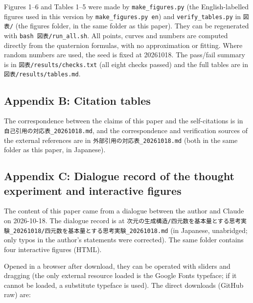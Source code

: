 \documentclass[
  a4paper,
]{article}
\begin{document}
Figures 1--6 and Tables 1--5 were made by \texttt{make\_\allowbreak{}figures.py} (the
English-labelled figures used in this version by
\texttt{make\_\allowbreak{}figures.py\ en}) and \texttt{verify\_\allowbreak{}tables.py} in
\texttt{図表/\allowbreak{}} (the figures folder, in the same folder as this paper).
They can be regenerated with \texttt{bash\ 図表/\allowbreak{}run\_\allowbreak{}all.sh}. All
points, curves and numbers are computed directly from the quaternion
formulas, with no approximation or fitting. Where random numbers are
used, the seed is fixed at 20261018. The pass/fail summary is in
\texttt{図表/\allowbreak{}results/\allowbreak{}checks.txt} (all eight checks passed) and the full
tables are in \texttt{図表/\allowbreak{}results/\allowbreak{}tables.md}.

\subsection{Appendix B: Citation
tables}\label{appendix-b-citation-tables}

The correspondence between the claims of this paper and the
self-citations is in \texttt{自己引用の対応表\_\allowbreak{}20261018.md}, and the
correspondence and verification sources of the external references are
in \texttt{外部引用の対応表\_\allowbreak{}20261018.md} (both in the same folder as
this paper, in Japanese).

\subsection{Appendix C: Dialogue record of the thought experiment and
interactive
figures}\label{appendix-c-dialogue-record-of-the-thought-experiment-and-interactive-figures}

The content of this paper came from a dialogue between the author and
Claude on 2026-10-18. The dialogue record is at
\texttt{次元の生成構造/\allowbreak{}四元数を基本量とする思考実験\_\allowbreak{}20261018/\allowbreak{}四元数を基本量とする思考実験\_\allowbreak{}20261018.md}
(in Japanese, unabridged; only typos in the author's statements were
corrected). The same folder contains four interactive figures (HTML).

Opened in a browser after download, they can be operated with sliders
and dragging (the only external resource loaded is the Google Fonts
typeface; if it cannot be loaded, a substitute typeface is used). The
direct downloads (GitHub raw) are:
\end{document}
